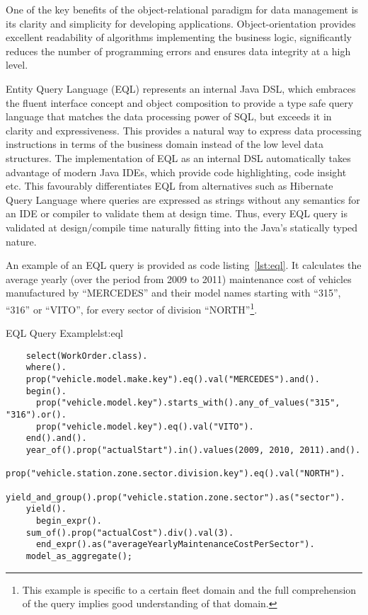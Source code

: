   One of the key benefits of the object-relational paradigm for data management is its clarity and simplicity for developing applications.
  Object-orientation provides excellent readability of algorithms implementing the business logic, significantly reduces the number of programming errors and ensures data integrity at a high level.
  
  Entity Query Language (EQL) represents an internal Java DSL, which embraces the fluent interface concept and object composition to provide a type safe query language that matches the data processing power of SQL, but exceeds it in clarity and expressiveness.
  This provides a natural way to express data processing instructions in terms of the business domain instead of the low level data structures.
  The implementation of EQL as an internal DSL automatically takes advantage of modern Java IDEs, which provide code highlighting, code insight etc.
  This favourably differentiates EQL from alternatives such as Hibernate Query Language where queries are expressed as strings without any semantics for an IDE or compiler to validate them at design time.
  Thus, every EQL query is validated at design/compile time naturally fitting into the Java's statically typed nature.
  
  An example of an EQL query is provided as code listing~\ref{lst:eql}.  
  It calculates the average yearly (over the period from 2009 to 2011) maintenance cost of vehicles manufactured by ``MERCEDES'' and their model names starting with ``315'', ``316'' or ``VITO'', for every sector of division ``NORTH''\footnote{This example is specific to a certain fleet domain and the full comprehension of the query implies good understanding of that domain.}.  

  \begin{code}{EQL Query Example}{lst:eql}
  \begin{lstlisting}
    select(WorkOrder.class).
    where().
    prop("vehicle.model.make.key").eq().val("MERCEDES").and().
    begin().
      prop("vehicle.model.key").starts_with().any_of_values("315", "316").or().
      prop("vehicle.model.key").eq().val("VITO").
    end().and().
    year_of().prop("actualStart").in().values(2009, 2010, 2011).and().
    prop("vehicle.station.zone.sector.division.key").eq().val("NORTH").
    yield_and_group().prop("vehicle.station.zone.sector").as("sector").
    yield().
      begin_expr().
	sum_of().prop("actualCost").div().val(3).
      end_expr().as("averageYearlyMaintenanceCostPerSector").
    model_as_aggregate();
  \end{lstlisting}
  \end{code}
  

